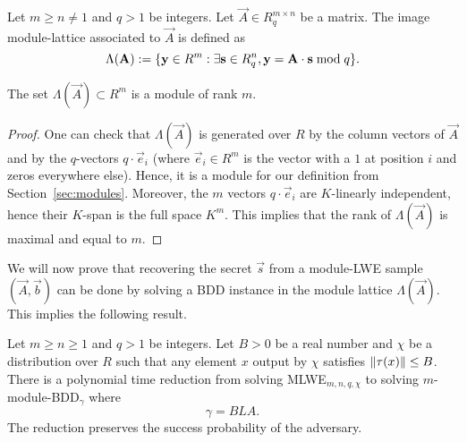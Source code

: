 \begin{definition}
Let $m \geq n \neq 1$ and $q > 1$ be integers. Let $\vec A \in R_q^{m \times n}$ be a matrix. The image module-lattice associated to $\vec A$ is defined as
\[ \Lambda(\vec A) := \{ \vec y \in R^m: \exists {\bf s} \in R_q^n, {\bf y} = {\bf A}\cdot {\bf s} \bmod q\}.\]
\end{definition}

\begin{lemma}
The set $\Lambda(\vec A) \subset R^m$ is a module of rank $m$.
\end{lemma}

\begin{proof}
One can check that $\Lambda(\vec A)$ is generated over $R$ by the column vectors of $\vec A$ and by the $q$-vectors $q \cdot \vec e_i$ (where $\vec e_i \in R^m$ is the vector with a $1$ at position $i$ and zeros everywhere else). Hence, it is a module for our definition from Section~\ref{sec:modules}.
Moreover, the $m$ vectors $q \cdot \vec e_i$ are $K$-linearly independent, hence their $K$-span is the full space $K^m$. This implies that the rank of $\Lambda(\vec A)$ is maximal and equal to $m$.
\end{proof}

We will now prove that recovering the secret $\vec s$ from a module-LWE sample $(\vec A, \vec b)$ can be done by solving a BDD instance in the module lattice $\Lambda(\vec A)$. This implies the following result.

\begin{theorem}
Let $m \geq n \geq 1$ and $q > 1$ be integers. Let $B >0$ be a real number and $\chi$ be a distribution over $R$ such that any element $x$ output by $\chi$ satisfies $\|\mink(x)\| \leq B$.
There is a polynomial time reduction from solving MLWE$_{m,n,q,\chi}$ to solving $m$-module-BDD$_{\gamma}$ where
\[ \gamma = BLA.\]
The reduction preserves the success probability of the adversary.
\end{theorem}


